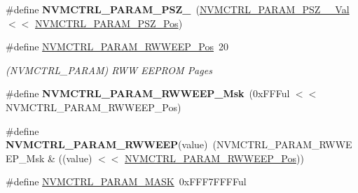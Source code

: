 \begin{DoxyCompactItemize}
\item 
\hypertarget{group___s_a_m_l21___n_v_m_c_t_r_l_ga3dc7aa1196aff3381eefe55a8789ca5d}{}\#define {\bfseries N\+V\+M\+C\+T\+R\+L\+\_\+\+P\+A\+R\+A\+M\+\_\+\+P\+S\+Z\+\_}~(\hyperlink{group___s_a_m_l21___n_v_m_c_t_r_l_ga7bffb82ccc9a71552882baabdfa97b13}{N\+V\+M\+C\+T\+R\+L\+\_\+\+P\+A\+R\+A\+M\+\_\+\+P\+S\+Z\+\_\+\_\+\+Val}    $<$$<$ \hyperlink{group___s_a_m_l21___n_v_m_c_t_r_l_gabec5624158a60a0f0d0b8a62afe18af8}{N\+V\+M\+C\+T\+R\+L\+\_\+\+P\+A\+R\+A\+M\+\_\+\+P\+S\+Z\+\_\+\+Pos})\label{group___s_a_m_l21___n_v_m_c_t_r_l_ga3dc7aa1196aff3381eefe55a8789ca5d}

\item 
\hypertarget{group___s_a_m_l21___n_v_m_c_t_r_l_gadbe4b71fb59b5853ceb8536c6292b4cc}{}\#define \hyperlink{group___s_a_m_l21___n_v_m_c_t_r_l_gadbe4b71fb59b5853ceb8536c6292b4cc}{N\+V\+M\+C\+T\+R\+L\+\_\+\+P\+A\+R\+A\+M\+\_\+\+R\+W\+W\+E\+E\+P\+\_\+\+Pos}~20\label{group___s_a_m_l21___n_v_m_c_t_r_l_gadbe4b71fb59b5853ceb8536c6292b4cc}

\begin{DoxyCompactList}\small\item\em (N\+V\+M\+C\+T\+R\+L\+\_\+\+P\+A\+R\+A\+M) R\+W\+W E\+E\+P\+R\+O\+M Pages \end{DoxyCompactList}\item 
\hypertarget{group___s_a_m_l21___n_v_m_c_t_r_l_gab2b3b61e1f28ca33f16a0328fac7d9c2}{}\#define {\bfseries N\+V\+M\+C\+T\+R\+L\+\_\+\+P\+A\+R\+A\+M\+\_\+\+R\+W\+W\+E\+E\+P\+\_\+\+Msk}~(0x\+F\+F\+Ful $<$$<$ N\+V\+M\+C\+T\+R\+L\+\_\+\+P\+A\+R\+A\+M\+\_\+\+R\+W\+W\+E\+E\+P\+\_\+\+Pos)\label{group___s_a_m_l21___n_v_m_c_t_r_l_gab2b3b61e1f28ca33f16a0328fac7d9c2}

\item 
\hypertarget{group___s_a_m_l21___n_v_m_c_t_r_l_ga4a74ee4bb2487c1d99869bf24e611ed5}{}\#define {\bfseries N\+V\+M\+C\+T\+R\+L\+\_\+\+P\+A\+R\+A\+M\+\_\+\+R\+W\+W\+E\+E\+P}(value)~(N\+V\+M\+C\+T\+R\+L\+\_\+\+P\+A\+R\+A\+M\+\_\+\+R\+W\+W\+E\+E\+P\+\_\+\+Msk \& ((value) $<$$<$ \hyperlink{group___s_a_m_l21___n_v_m_c_t_r_l_gadbe4b71fb59b5853ceb8536c6292b4cc}{N\+V\+M\+C\+T\+R\+L\+\_\+\+P\+A\+R\+A\+M\+\_\+\+R\+W\+W\+E\+E\+P\+\_\+\+Pos}))\label{group___s_a_m_l21___n_v_m_c_t_r_l_ga4a74ee4bb2487c1d99869bf24e611ed5}

\item 
\hypertarget{group___s_a_m_l21___n_v_m_c_t_r_l_gaadfbc70cd6cbb088b215b8e6322c4295}{}\#define \hyperlink{group___s_a_m_l21___n_v_m_c_t_r_l_gaadfbc70cd6cbb088b215b8e6322c4295}{N\+V\+M\+C\+T\+R\+L\+\_\+\+P\+A\+R\+A\+M\+\_\+\+M\+A\+S\+K}~0x\+F\+F\+F7\+F\+F\+F\+Ful\label{group___s_a_m_l21___n_v_m_c_t_r_l_gaadfbc70cd6cbb088b215b8e6322c4295}


\end{DoxyCompactItemize}
